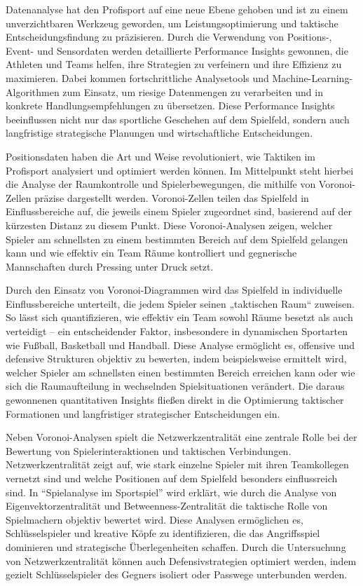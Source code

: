 \documentclass[
  number]{elsarticle}
\begin{document}
Datenanalyse hat den Profisport auf eine neue Ebene gehoben und ist zu
einem unverzichtbaren Werkzeug geworden, um Leistungsoptimierung und
taktische Entscheidungsfindung zu präzisieren. Durch die Verwendung von
Positions-, Event- und Sensordaten werden detaillierte Performance
Insights gewonnen, die Athleten und Teams helfen, ihre Strategien zu
verfeinern und ihre Effizienz zu maximieren. Dabei kommen
fortschrittliche Analysetools und Machine-Learning-Algorithmen zum
Einsatz, um riesige Datenmengen zu verarbeiten und in konkrete
Handlungsempfehlungen zu übersetzen. Diese Performance Insights
beeinflussen nicht nur das sportliche Geschehen auf dem Spielfeld,
sondern auch langfristige strategische Planungen und wirtschaftliche
Entscheidungen. \citep[p.~14]{memmert_sportinformatik}

Positionsdaten haben die Art und Weise revolutioniert, wie Taktiken im
Profisport analysiert und optimiert werden können. Im Mittelpunkt steht
hierbei die Analyse der Raumkontrolle und Spielerbewegungen, die
mithilfe von Voronoi-Zellen präzise dargestellt werden. Voronoi-Zellen
teilen das Spielfeld in Einflussbereiche auf, die jeweils einem Spieler
zugeordnet sind, basierend auf der kürzesten Distanz zu diesem Punkt.
Diese Voronoi-Analysen zeigen, welcher Spieler am schnellsten zu einem
bestimmten Bereich auf dem Spielfeld gelangen kann und wie effektiv ein
Team Räume kontrolliert und gegnerische Mannschaften durch Pressing
unter Druck setzt. \citep[pp.~240-243]{memmert_spielanalyse}

Durch den Einsatz von Voronoi-Diagrammen wird das Spielfeld in
individuelle Einflussbereiche unterteilt, die jedem Spieler seinen
„taktischen Raum`` zuweisen. So lässt sich quantifizieren, wie effektiv
ein Team sowohl Räume besetzt als auch verteidigt -- ein entscheidender
Faktor, insbesondere in dynamischen Sportarten wie Fußball, Basketball
und Handball. Diese Analyse ermöglicht es, offensive und defensive
Strukturen objektiv zu bewerten, indem beispielsweise ermittelt wird,
welcher Spieler am schnellsten einen bestimmten Bereich erreichen kann
oder wie sich die Raumaufteilung in wechselnden Spielsituationen
verändert. Die daraus gewonnenen quantitativen Insights fließen direkt
in die Optimierung taktischer Formationen und langfristiger
strategischer Entscheidungen ein.
\citep[pp.~66-71]{memmert_sportinformatik}

Neben Voronoi-Analysen spielt die Netzwerkzentralität eine zentrale
Rolle bei der Bewertung von Spielerinteraktionen und taktischen
Verbindungen. Netzwerkzentralität zeigt auf, wie stark einzelne Spieler
mit ihren Teamkollegen vernetzt sind und welche Positionen auf dem
Spielfeld besonders einflussreich sind. In ``Spielanalyse im
Sportspiel'' wird erklärt, wie durch die Analyse von
Eigenvektorzentralität und Betweenness-Zentralität die taktische Rolle
von Spielmachern objektiv bewertet wird. Diese Analysen ermöglichen es,
Schlüsselspieler und kreative Köpfe zu identifizieren, die das
Angriffsspiel dominieren und strategische Überlegenheiten schaffen.
Durch die Untersuchung von Netzwerkzentralität können auch
Defensivstrategien optimiert werden, indem gezielt Schlüsselspieler des
Gegners isoliert oder Passwege unterbunden werden.
\citep[pp.~178-182]{memmert_sportinformatik}
\end{document}
